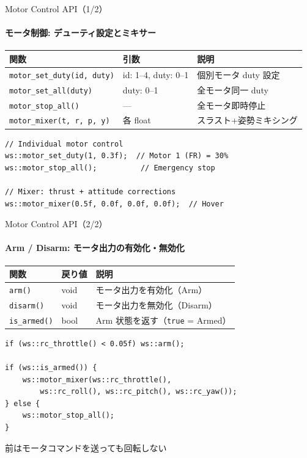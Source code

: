 \documentclass[aspectratio=169, 14pt]{beamer}
\begin{document}
\begin{frame}[fragile]{Motor Control API（1/2）}
  \framesubtitle{モータ制御: デューティ設定とミキサー}
  {\small
  \begin{tabular}{lll}
    \hline
    \textbf{関数} & \textbf{引数} & \textbf{説明} \\
    \hline
    \texttt{motor\_set\_duty(id, duty)} & id: 1--4, duty: 0--1 & 個別モータ duty 設定 \\
    \texttt{motor\_set\_all(duty)}      & duty: 0--1           & 全モータ同一 duty \\
    \texttt{motor\_stop\_all()}         & ---                   & 全モータ即時停止 \\
    \texttt{motor\_mixer(t, r, p, y)}   & 各 float             & スラスト+姿勢ミキシング \\
    \hline
  \end{tabular}
  }

  \vspace{0.3em}

  \begin{lstlisting}[style=sfcpp, basicstyle=\ttfamily\scriptsize]
// Individual motor control
ws::motor_set_duty(1, 0.3f);  // Motor 1 (FR) = 30%
ws::motor_stop_all();          // Emergency stop

// Mixer: thrust + attitude corrections
ws::motor_mixer(0.5f, 0.0f, 0.0f, 0.0f);  // Hover
  \end{lstlisting}
\end{frame}

\begin{frame}[fragile]{Motor Control API（2/2）}
  \framesubtitle{Arm / Disarm: モータ出力の有効化・無効化}
  {\small
  \begin{tabular}{lll}
    \hline
    \textbf{関数} & \textbf{戻り値} & \textbf{説明} \\
    \hline
    \texttt{arm()}       & void & モータ出力を有効化（Arm） \\
    \texttt{disarm()}    & void & モータ出力を無効化（Disarm） \\
    \texttt{is\_armed()} & bool & Arm 状態を返す（\texttt{true} = Armed） \\
    \hline
  \end{tabular}
  }

  \vspace{0.3em}

  \begin{lstlisting}[style=sfcpp, basicstyle=\ttfamily\scriptsize]
if (ws::rc_throttle() < 0.05f) ws::arm();

if (ws::is_armed()) {
    ws::motor_mixer(ws::rc_throttle(),
        ws::rc_roll(), ws::rc_pitch(), ws::rc_yaw());
} else {
    ws::motor_stop_all();
}
  \end{lstlisting}

  \vspace{0.2em}
  {\footnotesize {}  前はモータコマンドを送っても回転しない}
\end{frame}
\end{document}
